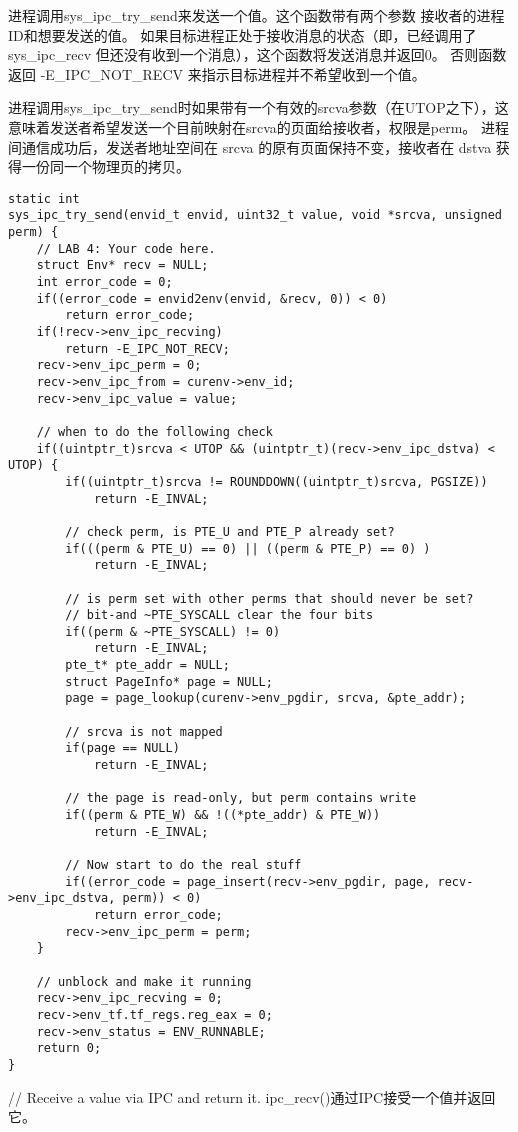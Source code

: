 \documentclass[12pt,a4paper]{article}
\begin{document}
进程调用sys\_ipc\_try\_send来发送一个值。这个函数带有两个参数 接收者的进程ID和想要发送的值。
如果目标进程正处于接收消息的状态（即，已经调用了 sys\_ipc\_recv 但还没有收到一个消息），这个函数将发送消息并返回0。
否则函数返回 -E\_IPC\_NOT\_RECV 来指示目标进程并不希望收到一个值。

进程调用sys\_ipc\_try\_send时如果带有一个有效的srcva参数（在UTOP之下），这意味着发送者希望发送一个目前映射在srcva的页面给接收者，权限是perm。
进程间通信成功后，发送者地址空间在 srcva 的原有页面保持不变，接收者在 dstva 获得一份同一个物理页的拷贝。
\begin{lstlisting}[style=CPP]
static int
sys_ipc_try_send(envid_t envid, uint32_t value, void *srcva, unsigned perm) {
	// LAB 4: Your code here.
	struct Env* recv = NULL;
	int error_code = 0;
	if((error_code = envid2env(envid, &recv, 0)) < 0)
		return error_code;
	if(!recv->env_ipc_recving)
		return -E_IPC_NOT_RECV;
	recv->env_ipc_perm = 0;
	recv->env_ipc_from = curenv->env_id;
    recv->env_ipc_value = value;

	// when to do the following check
	if((uintptr_t)srcva < UTOP && (uintptr_t)(recv->env_ipc_dstva) < UTOP) {
		if((uintptr_t)srcva != ROUNDDOWN((uintptr_t)srcva, PGSIZE))
            return -E_INVAL;

		// check perm, is PTE_U and PTE_P already set?
		if(((perm & PTE_U) == 0) || ((perm & PTE_P) == 0) )
            return -E_INVAL;

		// is perm set with other perms that should never be set?
		// bit-and ~PTE_SYSCALL clear the four bits
		if((perm & ~PTE_SYSCALL) != 0)
			return -E_INVAL;
		pte_t* pte_addr = NULL;
		struct PageInfo* page = NULL;
		page = page_lookup(curenv->env_pgdir, srcva, &pte_addr);

        // srcva is not mapped
		if(page == NULL)
            return -E_INVAL;

		// the page is read-only, but perm contains write
		if((perm & PTE_W) && !((*pte_addr) & PTE_W))
			return -E_INVAL;

        // Now start to do the real stuff
		if((error_code = page_insert(recv->env_pgdir, page, recv->env_ipc_dstva, perm)) < 0)
			return error_code;
		recv->env_ipc_perm = perm;
    }

	// unblock and make it running
	recv->env_ipc_recving = 0;
	recv->env_tf.tf_regs.reg_eax = 0;
	recv->env_status = ENV_RUNNABLE;
	return 0;
}
\end{lstlisting}

// Receive a value via IPC and return it.
ipc\_recv()通过IPC接受一个值并返回它。
\end{document}
